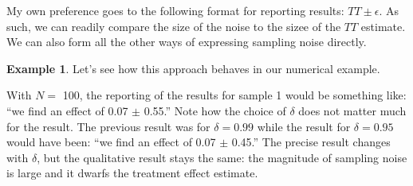\documentclass[
]{book}
\newenvironment{Shaded}{\begin{snugshade}}{\end{snugshade}}
\newcommand{\AttributeTok}[1]{\textcolor[rgb]{0.77,0.63,0.00}{#1}}
\newcommand{\ControlFlowTok}[1]{\textcolor[rgb]{0.13,0.29,0.53}{\textbf{#1}}}
\newcommand{\DecValTok}[1]{\textcolor[rgb]{0.00,0.00,0.81}{#1}}
\newcommand{\FloatTok}[1]{\textcolor[rgb]{0.00,0.00,0.81}{#1}}
\newcommand{\FunctionTok}[1]{\textcolor[rgb]{0.00,0.00,0.00}{#1}}
\newcommand{\NormalTok}[1]{#1}
\newcommand{\OtherTok}[1]{\textcolor[rgb]{0.56,0.35,0.01}{#1}}
\newcommand{\SpecialCharTok}[1]{\textcolor[rgb]{0.00,0.00,0.00}{#1}}
\newcommand{\StringTok}[1]{\textcolor[rgb]{0.31,0.60,0.02}{#1}}
\theoremstyle{definition}
\theoremstyle{definition}
\newtheorem{example}{Example}[chapter]
\theoremstyle{definition}
\theoremstyle{definition}
\theoremstyle{remark}
\begin{document}
My own preference goes to the following format for reporting results: \(TT \pm \epsilon\).
As such, we can readily compare the size of the noise to the sizee of the \(TT\) estimate.
We can also form all the other ways of expressing sampling noise directly.

\begin{example}
\protect\hypertarget{exm:unnamed-chunk-37}{}{\label{exm:unnamed-chunk-37} }Let's see how this approach behaves in our numerical example.
\end{example}

\begin{Shaded}
\end{Shaded}

With \(N=\) 100, the reporting of the results for sample 1 would be something like: ``we find an effect of 0.07 \(\pm\) 0.55.''
Note how the choice of \(\delta\) does not matter much for the result.
The previous result was for \(\delta=0.99\) while the result for \(\delta=0.95\) would have been: ``we find an effect of 0.07 \(\pm\) 0.45.''
The precise result changes with \(\delta\), but the qualitative result stays the same: the magnitude of sampling noise is large and it dwarfs the treatment effect estimate.
\end{document}
